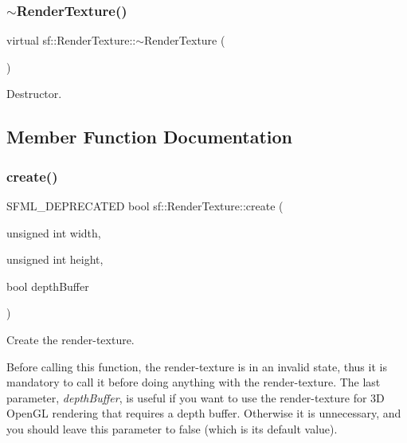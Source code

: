 \subsubsection{\texorpdfstring{$\sim$RenderTexture()}{~RenderTexture()}}
{\footnotesize\ttfamily virtual sf\+::\+Render\+Texture\+::$\sim$\+Render\+Texture (\begin{DoxyParamCaption}{ }\end{DoxyParamCaption})\hspace{0.3cm}{\ttfamily [virtual]}}



Destructor. 

\begin{DoxyVerb}\end{DoxyVerb}
 

\subsection{Member Function Documentation}
\mbox{\label{classsf_1_1_render_texture_aaec1fb8ee77844da50b0143cb41c8a71}} 
\subsubsection{\texorpdfstring{create()}{create()}\hspace{0.1cm}{\footnotesize\ttfamily [1/2]}}
{\footnotesize\ttfamily S\+F\+M\+L\+\_\+\+D\+E\+P\+R\+E\+C\+A\+T\+ED bool sf\+::\+Render\+Texture\+::create (\begin{DoxyParamCaption}\item[{unsigned int}]{width,  }\item[{unsigned int}]{height,  }\item[{bool}]{depth\+Buffer }\end{DoxyParamCaption})}



Create the render-\/texture. 

Before calling this function, the render-\/texture is in an invalid state, thus it is mandatory to call it before doing anything with the render-\/texture. The last parameter, {\itshape depth\+Buffer}, is useful if you want to use the render-\/texture for 3D Open\+GL rendering that requires a depth buffer. Otherwise it is unnecessary, and you should leave this parameter to false (which is its default value).


